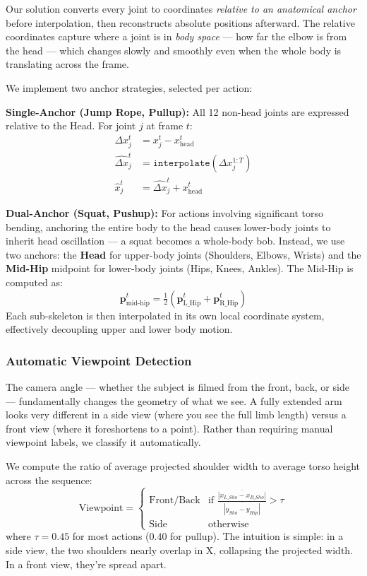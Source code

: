 \documentclass[10pt, twocolumn, a4paper]{article}
\begin{document}
Our solution converts every joint to coordinates \textit{relative to an anatomical anchor} before interpolation, then reconstructs absolute positions afterward. The relative coordinates capture where a joint is in \textit{body space} — how far the elbow is from the head — which changes slowly and smoothly even when the whole body is translating across the frame.

We implement two anchor strategies, selected per action:

\textbf{Single-Anchor (Jump Rope, Pullup):} All 12 non-head joints are expressed relative to the Head. For joint $j$ at frame $t$:
\begin{align}
\Delta x_j^t &= x_j^t - x_{\text{head}}^t \\
\hat{\Delta x}_j^t &= \texttt{interpolate}(\Delta x_j^{1:T}) \\
\hat{x}_j^t &= \hat{\Delta x}_j^t + x_{\text{head}}^t
\end{align}

\textbf{Dual-Anchor (Squat, Pushup):} For actions involving significant torso bending, anchoring the entire body to the head causes lower-body joints to inherit head oscillation — a squat becomes a whole-body bob. Instead, we use two anchors: the \textbf{Head} for upper-body joints (Shoulders, Elbows, Wrists) and the \textbf{Mid-Hip} midpoint for lower-body joints (Hips, Knees, Ankles). The Mid-Hip is computed as:
\begin{equation}
\mathbf{p}_{\text{mid-hip}}^t = \tfrac{1}{2}(\mathbf{p}_{\text{L\_Hip}}^t + \mathbf{p}_{\text{R\_Hip}}^t)
\end{equation}
Each sub-skeleton is then interpolated in its own local coordinate system, effectively decoupling upper and lower body motion.

\subsubsection{Automatic Viewpoint Detection}
The camera angle — whether the subject is filmed from the front, back, or side — fundamentally changes the geometry of what we see. A fully extended arm looks very different in a side view (where you see the full limb length) versus a front view (where it foreshortens to a point). Rather than requiring manual viewpoint labels, we classify it automatically.

We compute the ratio of average projected shoulder width to average torso height across the sequence:
\begin{equation}
\text{Viewpoint} = 
\begin{cases} 
\text{Front/Back} & \text{if } \frac{\overline{|x_{L\_Sho} - x_{R\_Sho}|}}{\overline{|y_{Sho} - y_{Hip}|}} > \tau \\ 
\text{Side} & \text{otherwise} 
\end{cases}
\end{equation}
where $\tau = 0.45$ for most actions ($0.40$ for pullup). The intuition is simple: in a side view, the two shoulders nearly overlap in X, collapsing the projected width. In a front view, they're spread apart.
\end{document}
